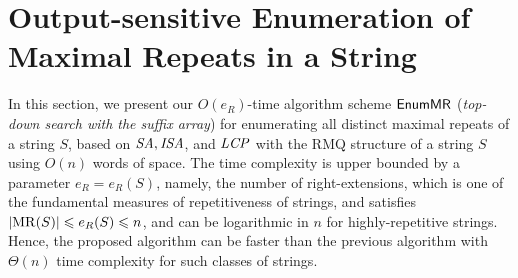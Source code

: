 \section{Output-sensitive Enumeration of Maximal Repeats in a String}
\label{sec:algo}
In this section, we present our $O(e_R)$-time algorithm scheme $\textsf{EnumMR}$ (\textit{top-down search with the suffix array}) for enumerating all distinct maximal repeats of a string $S$,  based on $\mathit{SA}, \mathit{ISA}$, and $\mathit{LCP}$ with the RMQ structure of a string $S$ using $O(n)$ words of space. The time complexity is upper bounded by a parameter $e_R = e_R(S)$, namely, the number of right-extensions, which is one of the fundamental measures of repetitiveness of strings, and satisfies $|\mathrm{MR}(S)| \leqslant e_R(S) \leqslant n$, and can be logarithmic in $n$ for highly-repetitive strings. Hence, the proposed algorithm can be faster than the previous algorithm with $\Theta(n)$ time complexity for such classes of strings. 




